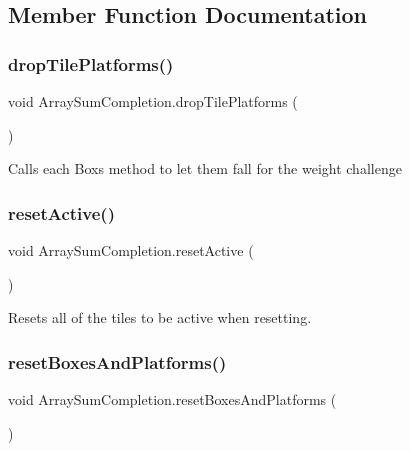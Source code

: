 \subsection{Member Function Documentation}
\mbox{\label{class_array_sum_completion_ac1c819eeab2598e8c2c2e1e78e15a666}} 
\subsubsection{\texorpdfstring{drop\+Tile\+Platforms()}{dropTilePlatforms()}}
{\footnotesize\ttfamily void Array\+Sum\+Completion.\+drop\+Tile\+Platforms (\begin{DoxyParamCaption}{ }\end{DoxyParamCaption})}

Calls each Box\textquotesingle{}s method to let them fall for the weight challenge \mbox{\label{class_array_sum_completion_a9c8cbe4d07015cd0e6c958e39e0e92d2}} 
\subsubsection{\texorpdfstring{reset\+Active()}{resetActive()}}
{\footnotesize\ttfamily void Array\+Sum\+Completion.\+reset\+Active (\begin{DoxyParamCaption}{ }\end{DoxyParamCaption})}



Resets all of the tiles to be active when resetting. 

\mbox{\label{class_array_sum_completion_a1289c469259345582c0227f7a617a19f}} 
\subsubsection{\texorpdfstring{reset\+Boxes\+And\+Platforms()}{resetBoxesAndPlatforms()}}
{\footnotesize\ttfamily void Array\+Sum\+Completion.\+reset\+Boxes\+And\+Platforms (\begin{DoxyParamCaption}{ }\end{DoxyParamCaption})}



